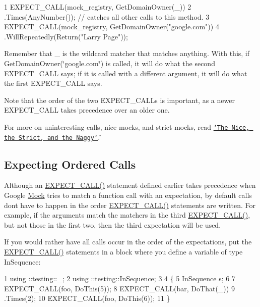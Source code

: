 \begin{DoxyCode}
1 EXPECT\_CALL(mock\_registry, GetDomainOwner(\_))
2       .Times(AnyNumber());  // catches all other calls to this method.
3 EXPECT\_CALL(mock\_registry, GetDomainOwner("google.com"))
4       .WillRepeatedly(Return("Larry Page"));
\end{DoxyCode}


Remember that {\ttfamily \+\_\+} is the wildcard matcher that matches anything. With this, if {\ttfamily Get\+Domain\+Owner(\char`\"{}google.\+com\char`\"{})} is called, it will do what the second {\ttfamily E\+X\+P\+E\+C\+T\+\_\+\+C\+A\+LL} says; if it is called with a different argument, it will do what the first {\ttfamily E\+X\+P\+E\+C\+T\+\_\+\+C\+A\+LL} says.

Note that the order of the two {\ttfamily E\+X\+P\+E\+C\+T\+\_\+\+C\+A\+L\+Ls} is important, as a newer {\ttfamily E\+X\+P\+E\+C\+T\+\_\+\+C\+A\+LL} takes precedence over an older one.

For more on uninteresting calls, nice mocks, and strict mocks, read \href{#the-nice-the-strict-and-the-naggy}{\tt \char`\"{}\+The Nice, the Strict, and the Naggy\char`\"{}}.

\subsection*{Expecting Ordered Calls}

Although an {\ttfamily \hyperlink{gmock-spec-builders_8h_a535a6156de72c1a2e25a127e38ee5232}{E\+X\+P\+E\+C\+T\+\_\+\+C\+A\+L\+L()}} statement defined earlier takes precedence when Google \hyperlink{class_mock}{Mock} tries to match a function call with an expectation, by default calls don\textquotesingle{}t have to happen in the order {\ttfamily \hyperlink{gmock-spec-builders_8h_a535a6156de72c1a2e25a127e38ee5232}{E\+X\+P\+E\+C\+T\+\_\+\+C\+A\+L\+L()}} statements are written. For example, if the arguments match the matchers in the third {\ttfamily \hyperlink{gmock-spec-builders_8h_a535a6156de72c1a2e25a127e38ee5232}{E\+X\+P\+E\+C\+T\+\_\+\+C\+A\+L\+L()}}, but not those in the first two, then the third expectation will be used.

If you would rather have all calls occur in the order of the expectations, put the {\ttfamily \hyperlink{gmock-spec-builders_8h_a535a6156de72c1a2e25a127e38ee5232}{E\+X\+P\+E\+C\+T\+\_\+\+C\+A\+L\+L()}} statements in a block where you define a variable of type {\ttfamily In\+Sequence}\+:


\begin{DoxyCode}
1 using ::testing::\_;
2 using ::testing::InSequence;
3 
4 \{
5   InSequence s;
6 
7   EXPECT\_CALL(foo, DoThis(5));
8   EXPECT\_CALL(bar, DoThat(\_))
9       .Times(2);
10   EXPECT\_CALL(foo, DoThis(6));
11 \}
\end{DoxyCode}


